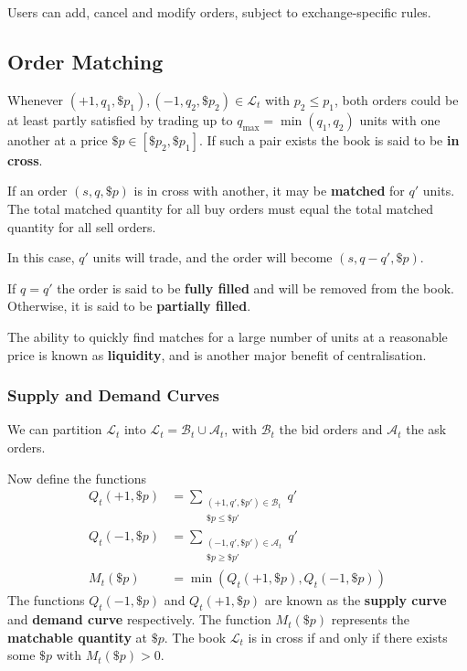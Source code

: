 \documentclass{article}
\begin{document}
Users can add, cancel and modify orders, subject to exchange-specific rules.%

\subsection{Order Matching}
Whenever $(+1,q_1,\$p_1), (-1,q_2,\$p_2)\in\mathcal{L}_t$ with $p_2\leq p_1$, both orders could be at least partly satisfied by trading up to $q_{\max}=\min(q_1,q_2)$ units with one another at a price $\$p\in[\$p_2,\$p_1]$. If such a pair exists the book is said to be \textbf{in cross}.

If an order $(s,q,\$p)$ is in cross with another, it may be \textbf{matched} for $q'$ units. The total matched quantity for all buy orders must equal the total matched quantity for all sell orders.

In this case, $q'$ units will trade, and the order will become $(s,q-q',\$p)$.

If $q=q'$ the order is said to be \textbf{fully filled} and will be removed from the book. Otherwise, it is said to be \textbf{partially filled}.

The ability to quickly find matches for a large number of units at a reasonable price is known as \textbf{liquidity}, and is another major benefit of centralisation.

\subsubsection{Supply and Demand Curves}
We can partition $\mathcal{L}_t$ into $\mathcal{L}_t = \mathcal{B}_t\cup\mathcal{A}_t$, with $\mathcal{B}_t$ the bid orders and $\mathcal{A}_t$ the ask orders.

Now define the functions
\begin{align*}
	Q_t(+1,\$p)	&= \sum_{\substack{(+1,q',\$p') \in \mathcal{B}_t \\ \$p\leq \$p'}} q'
\\	Q_t(-1,\$p)	&= \sum_{\substack{(-1,q',\$p') \in \mathcal{A}_t \\ \$p\geq \$p'}} q'
\\	M_t(\$p)	&= \min(Q_t(+1,\$p),Q_t(-1,\$p))
\end{align*}
The functions $Q_t(-1,\$p)$ and $Q_t(+1,\$p)$ are known as the \textbf{supply curve} and \textbf{demand curve} respectively. The function $M_t(\$p)$ represents the \textbf{matchable quantity} at $\$p$.
The book $\mathcal{L}_t$ is in cross if and only if there exists some $\$p$ with $M_t(\$p)>0$.
\end{document}
